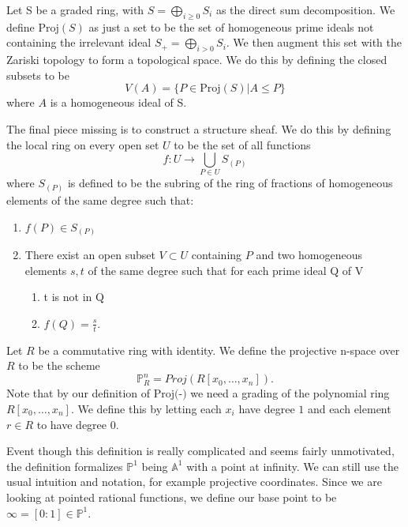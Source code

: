 \begin{construction}\label{Proj construction}
%
%
Let S be a graded ring, with \(S=\displaystyle \bigoplus_{i\geq 0} S_i\) as the direct sum decomposition. We define \(\text{Proj}(S)\) as just a set to be the set of homogeneous prime ideals not containing the irrelevant ideal \(S_+=\displaystyle \bigoplus_{i>0}S_i\). We then augment this set with the Zariski topology to form a topological space. We do this by defining the closed subsets to be 
%
\begin{equation*}
    V(A) = \{P\in \text{Proj}(S)|A\leq P\}
\end{equation*}
%
where \(A\) is a homogeneous ideal of S.

The final piece missing is to construct a structure sheaf. We do this by defining the local ring on every open set \(U\) to be the set of all functions 
%
\begin{equation*}
%
    f:U\longrightarrow \bigcup_{P\in U}S_{(P)}
%
\end{equation*}
%
where \(S_{(P)}\) is defined to be the subring of the ring of fractions of homogeneous elements of the same degree such that:
%
\begin{enumerate}
%
    \item \(f(P)\in S_{(P)}\)
    \item There exist an open subset \(V \subset U\) containing \(P\) and two homogeneous elements \(s,t\) of the same degree such that for each prime ideal Q of V
%
    \begin{enumerate}
        \item t is not in Q
        \item \(f(Q) = \frac{s}{t}\).
    \end{enumerate}
%
\end{enumerate}
%
\end{construction}
%
\begin{definition}\label{Def:Projective n-space}
%
Let \(R\) be a commutative ring with identity. We define the projective n-space over \(R\) to be the scheme
%
\begin{equation*}
    \mathbb{P}_R^n = Proj(R[x_0, \dots, x_n]).
\end{equation*}
%
Note that by our definition of \(\text{Proj(-)}\) we need a grading of the polynomial ring \(R[x_0,\dots,x_n]\). We define this by letting each \(x_i\) have degree \(1\) and each element \(r\in R\) to have degree \(0\). 
%
\end{definition}
%
Event though this definition is really complicated and seems fairly unmotivated, the definition formalizes \(\mathbb{P}^1\) being \(\mathbb{A}^1\) with a point at infinity. We can still use the usual intuition and notation, for example projective coordinates. Since we are looking at pointed rational functions, we define our base point to be \(\infty = [0:1] \in \mathbb{P}^1\).
%

